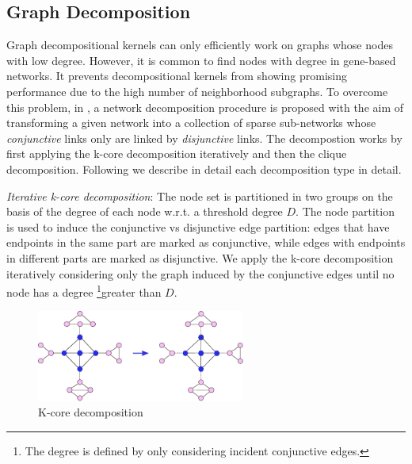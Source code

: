 \subsection*{Graph Decomposition} 
\label{network-decomposition}
Graph decompositional kernels can only efficiently work on graphs whose nodes with low degree. However, it is common to find nodes with degree in gene-based networks. It prevents decompositional kernels from showing promising performance due to the high number of neighborhood subgraphs. To overcome this problem, in \cite{cdnk}, a network decomposition procedure is proposed with the aim of transforming a given network into a collection of sparse sub-networks whose \textit{conjunctive} links only are linked by \textit{disjunctive} links. The decompostion works by first applying the k-core decomposition iteratively and then the clique decomposition. Following we describe in detail each decomposition type in detail.

\textit{Iterative k-core decomposition}: The node set is partitioned in two groups on the basis of the degree of each node w.r.t. a threshold degree $D$. The node partition is used to induce the conjunctive vs disjunctive edge partition: edges that have endpoints in the same part are marked as conjunctive, while edges with endpoints in different parts are marked as disjunctive. We apply the k-core decomposition iteratively considering only the graph induced by the conjunctive edges until no node has a degree \footnote{The degree is defined by only considering incident conjunctive edges.}greater than $D$.

\begin{figure}[ht]
\includegraphics[width=0.9\columnwidth, height=3cm]{img/k_core.pdf}
\caption{K-core decomposition}
\label{fig:01}
\end{figure}

